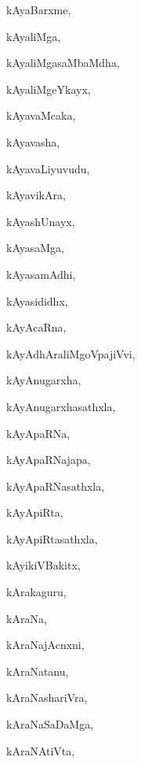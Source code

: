 \begin{multicols}{3}
{\noindent
{kAyaBarxme}, \pageref{kAyaBarxme}

\noindent
{kAyaliMga}, \pageref{kAyaliMga}

\noindent
{kAyaliMgasaMbaMdha}, \pageref{kAyaliMgasaMbaMdha}

\noindent
{kAyaliMgeYkayx}, \pageref{kAyaliMgeYkayx}

\noindent
{kAyavaMcaka}, \pageref{kAyavaMcaka}

\noindent
{kAyavasha}, \pageref{kAyavasha}

\noindent
{kAyavaLiyuvudu}, \pageref{kAyavaLiyuvudu}

\noindent
{kAyavikAra}, \pageref{kAyavikAra}

\noindent
{kAyashUnayx}, \pageref{kAyashUnayx}

\noindent
{kAyasaMga}, \pageref{kAyasaMga}

\noindent
{kAyasamAdhi}, \pageref{kAyasamAdhi}

\noindent
{kAyasididhx}, \pageref{kAyasididhx}

\noindent
{kAyAcaRna}, \pageref{kAyAcaRna}

\noindent
{kAyAdhAraliMgoVpajiVvi}, \pageref{kAyAdhAraliMgoVpajiVvi}

\noindent
{kAyAnugarxha}, \pageref{kAyAnugarxha}

\noindent
{kAyAnugarxhasathxla}, \pageref{kAyAnugarxhasathxla}

\noindent
{kAyApaRNa}, \pageref{kAyApaRNa}

\noindent
{kAyApaRNajapa}, \pageref{kAyApaRNajapa}

\noindent
{kAyApaRNasathxla}, \pageref{kAyApaRNasathxla}

\noindent
{kAyApiRta}, \pageref{kAyApiRta}

\noindent
{kAyApiRtasathxla}, \pageref{kAyApiRtasathxla}

\noindent
{kAyikiVBakitx}, \pageref{kAyikiVBakitx}

\noindent
{kArakaguru}, \pageref{kArakaguru}

\noindent
{kAraNa}, \pageref{kAraNa}

\noindent
{kAraNajAcnxni}, \pageref{kAraNajAcnxni}

\noindent
{kAraNatanu}, \pageref{kAraNatanu}

\noindent
{kAraNashariVra}, \pageref{kAraNashariVra}

\noindent
{kAraNaSaDaMga}, \pageref{kAraNaSaDaMga}

\noindent
{kAraNAtiVta}, \pageref{kAraNAtiVta}

}
\end{multicols}
